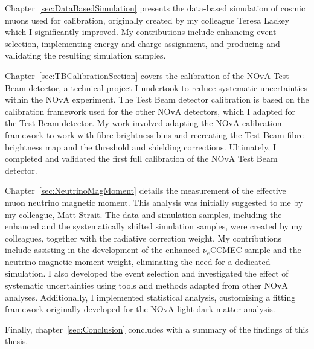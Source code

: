 Chapter~\ref{sec:DataBasedSimulation} presents the data-based simulation of cosmic muons used for calibration, originally created by my colleague Teresa Lackey which I significantly improved. My contributions include enhancing event selection, implementing energy and charge assignment, and producing and validating the resulting simulation samples.

Chapter~\ref{sec:TBCalibrationSection} covers the calibration of the NOvA Test Beam detector, a technical project I undertook to reduce systematic uncertainties within the NOvA experiment. The Test Beam detector calibration is based on the calibration framework used for the other NOvA detectors, which I adapted for the Test Beam detector. My work involved adapting the NOvA calibration framework to work with fibre brightness bins and recreating the Test Beam fibre brightness map and the threshold and shielding corrections. Ultimately, I completed and validated the first full calibration of the NOvA Test Beam detector.

Chapter~\ref{sec:NeutrinoMagMoment} details the measurement of the effective muon neutrino magnetic moment. This analysis was initially suggested to me by my colleague, Matt Strait. The data and simulation samples, including the enhanced and the systematically shifted simulation samples, were created by my colleagues, together with the radiative correction weight. My contributions include assisting in the development of the enhanced $\nu_e$CCMEC sample and the neutrino magnetic moment weight, eliminating the need for a dedicated simulation. I also developed the event selection and investigated the effect of systematic uncertainties using tools and methods adapted from other NOvA analyses. Additionally, I implemented statistical analysis, customizing a fitting framework originally developed for the NOvA light dark matter analysis.

Finally, chapter~\ref{sec:Conclusion} concludes with a summary of the findings of this thesis.

\iffalse

